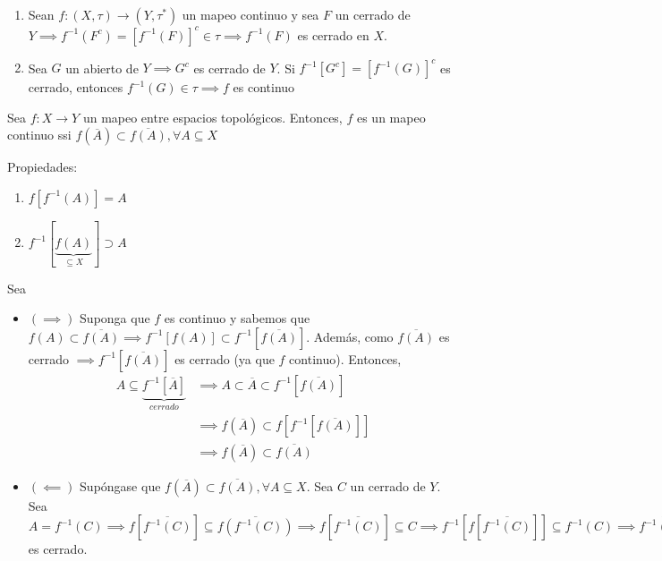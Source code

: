 \begin{nota}
    \begin{enumerate}
        \item Sean $f:(X,\tau)\to(Y,\tau^*)$ un mapeo continuo y sea $F$ un cerrado de $Y\implies f^{-1}(F^c)=\left[f^{-1}(F)\right]^c\in \tau \implies f^{-1}(F)$ es cerrado en $X$.  
        \item Sea $G$ un abierto de $Y\implies G^c$ es cerrado de $Y$. Si $f^{-1}[G^c]=[f^{-1}(G)]^c$ es cerrado, entonces $f^{-1}(G)\in \tau\implies f$ es continuo 
    \end{enumerate}
    
\end{nota}


\begin{prop}
    Sea $f:X\to Y$ un mapeo entre espacios topológicos. Entonces, $f$ es un mapeo continuo ssi $f(\overline{A})\subset \overline{f(A)},\forall A\subseteq X$
    \begin{cajita}
        Propiedades: 
        \begin{enumerate}
            \item $f[f^{-1}(A)]=A$
            \item $f^{-1}[\underbrace{f(A)}_{\subseteq X}]\supset A$
        \end{enumerate}
    \end{cajita}
    \begin{dem}
        Sea
        \begin{itemize}
            \item $(\implies )$ Suponga que $f$ es continuo y sabemos que $f(A)\subset \overline{f(A)}\implies f^{-1}[f(A)]\subset f^{-1}[\overline{f(A)}]$. Además, como $\overline{f(A)}$ es cerrado $\implies f^{-1}[\overline{f(A)}]$ es cerrado (ya que $f$ continuo). Entonces, 
            \begin{align*}
                A\subseteq \underbrace{f^{-1}[\overline{A}]}_{cerrado} &\implies A\subset \overline{A}\subset f^{-1}[\overline{f(A)}]\\
                &\implies f(\overline{A})\subset f[f^{-1}[\overline{f(A)}]]\\
                &\implies f(\overline{A})\subset \overline{f(A)}
            \end{align*}
            \item $(\impliedby)$ Supóngase que $f(\overline{A})\subset \overline{f(A)},\forall A\subseteq X$. Sea $C$ un cerrado de $Y$. Sea $A=f^{-1}(C)\implies f[\overline{f^{-1}(C)}]\subseteq \overline{f(f^{-1}(C))}\implies f[\overline{f^{-1}(C)}]\subseteq C\implies f^{-1}[f[\overline{f^{-1}(C)}]]\subseteq f^{-1}(C)\implies \overline{f^{-1}(C)}\subset f^{-1}(C)\implies f^{-1}(C)\subset \overline{f^{-1}(C)}\subset f^{-1}(C)\implies f^{-1}(C)=\overline{f^{-1}(C)}\implies f^{-1}(C)$ es cerrado. 
        \end{itemize}
    \end{dem}
\end{prop}
